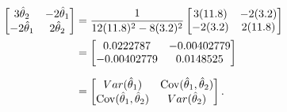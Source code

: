 \begin{solution}
\begin{align*}
\begin{bmatrix}
            3\hat{\theta}_2 & -2\hat{\theta}_1 \\
            -2\hat{\theta}_1 & 2\hat{\theta}_2
        \end{bmatrix}
        &= \frac{1}{12(11.8)^2 - 8(3.2)^2} \begin{bmatrix}
            3(11.8) & -2(3.2) \\
            -2(3.2) & 2(11.8)
        \end{bmatrix}\\ 
        &= \begin{bmatrix}
            0.0222787 & -0.00402779 \\
            -0.00402779 & 0.0148525
        \end{bmatrix}\\[0.6em]
        &= \begin{bmatrix}
            Var(\hat{\theta}_1) & \operatorname*{Cov}(\hat{\theta}_1, \hat{\theta}_2)\\
            \operatorname*{Cov}(\hat{\theta}_1, \hat{\theta}_2) & Var(\hat{\theta}_2)
        \end{bmatrix}.
    \end{align*}


\end{solution}
